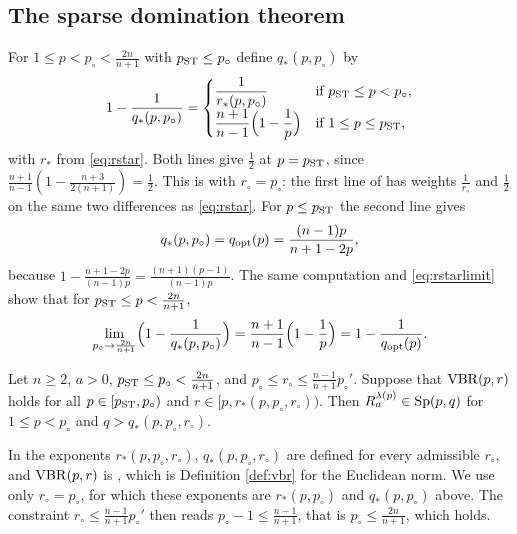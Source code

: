\subsection{The sparse domination theorem}\label{ssec:brs}
For $1\le p<p_\circ<\frac{2n}{n+1}$ with $p_{\rm ST}\le p_\circ$ define $q_*(p,p_\circ)$ by
\begin{equation}\label{eq:qstar}
1-\frac1{q_*(p,p_\circ)}=
\begin{cases}
\dfrac1{r_*(p,p_\circ)}&\text{if }p_{\rm ST}\le p<p_\circ,\\[2mm]
\dfrac{n+1}{n-1}\Bigl(1-\dfrac1p\Bigr)&\text{if }1\le p\le p_{\rm ST},
\end{cases}
\end{equation}
with $r_*$ from \eqref{eq:rstar}. Both lines give $\frac12$ at $p=p_{\rm ST}$, since
$\frac{n+1}{n-1}(1-\frac{n+3}{2(n+1)})=\frac12$. This is \cite[(2.1)]{BRS25} with $r_\circ=p_\circ$: the
first line of \cite[(2.1)]{BRS25} has weights $\frac1{r_\circ}$ and $\frac12$ on the same two
differences as \eqref{eq:rstar}. For $p\le p_{\rm ST}$ the second line gives
\begin{equation}\label{eq:qopt}
q_*(p,p_\circ)=q_{\rm opt}(p)=\frac{(n-1)p}{n+1-2p},
\end{equation}
because $1-\frac{n+1-2p}{(n-1)p}=\frac{(n+1)(p-1)}{(n-1)p}$. The same computation and
\eqref{eq:rstarlimit} show that for $p_{\rm ST}\le p<\frac{2n}{n+1}$,
\begin{equation}\label{eq:qstarlimit}
\lim_{p_\circ\to\frac{2n}{n+1}}\Bigl(1-\frac1{q_*(p,p_\circ)}\Bigr)=\frac{n+1}{n-1}\Bigl(1-\frac1p\Bigr)
=1-\frac1{q_{\rm opt}(p)} .
\end{equation}

\begin{theorem}\label{thm:brs}
Let $n\ge2$, $a>0$, $p_{\rm ST}\le p_\circ<\frac{2n}{n+1}$, and $p_\circ\le r_\circ\le\frac{n-1}{n+1}p_\circ'$.
Suppose that $\mathrm{VBR}(p,r)$ holds for all $p\in[p_{\rm ST},p_\circ)$ and $r\in[p,r_*(p,p_\circ,r_\circ))$. Then
$R^{\lambda(p)}_a\in\mathrm{Sp}(p,q)$ for $1\le p<p_\circ$ and $q>q_*(p,p_\circ,r_\circ)$.
\end{theorem}

In \cite{BRS25} the exponents $r_*(p,p_\circ,r_\circ)$, $q_*(p,p_\circ,r_\circ)$ are defined for every admissible
$r_\circ$, and $\mathrm{VBR}(p,r)$ is \cite[Definition 2.2]{BRS25}, which is Definition \ref{def:vbr} for the
Euclidean norm. We use only $r_\circ=p_\circ$, for which these exponents are $r_*(p,p_\circ)$ and
$q_*(p,p_\circ)$ above. The constraint $r_\circ\le\frac{n-1}{n+1}p_\circ'$ then reads
$p_\circ-1\le\frac{n-1}{n+1}$, that is $p_\circ\le\frac{2n}{n+1}$, which holds.

